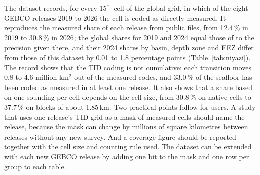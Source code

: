 \documentclass[essd, manuscript]{copernicus}
\newcommand{\as}{$^{\prime\prime}$}      %
\renewcommand{\_}{\usorig\allowbreak}
\begin{document}
The dataset records, for every 15\as\ cell of the global grid, in which of the eight GEBCO releases 2019 to 2026 the cell is coded as directly measured.
It reproduces the measured share of each release from public files, from 12.4\,\% in 2019 to 30.8\,\% in 2026; the global shares for 2019 and 2024 equal those of \citet{niyazi2025} to the precision given there, and their 2024 shares by basin, depth zone and EEZ differ from those of this dataset by 0.01 to 1.8 percentage points (Table~\ref{tab:niyazi}).
The record shows that the TID coding is not cumulative: each transition moves 0.8 to 4.6 million km$^2$ out of the measured codes, and 33.0\,\% of the seafloor has been coded as measured in at least one release.
It also shows that a share based on one sounding per cell depends on the cell size, from 30.8\,\% on native cells to 37.7\,\% on blocks of about 1.85\,km.
Two practical points follow for users.
A study that uses one release's TID grid as a mask of measured cells should name the release, because the mask can change by millions of square kilometres between releases without any new survey.
And a coverage figure should be reported together with the cell size and counting rule used.
The dataset can be extended with each new GEBCO release by adding one bit to the mask and one row per group to each table.
\end{document}

